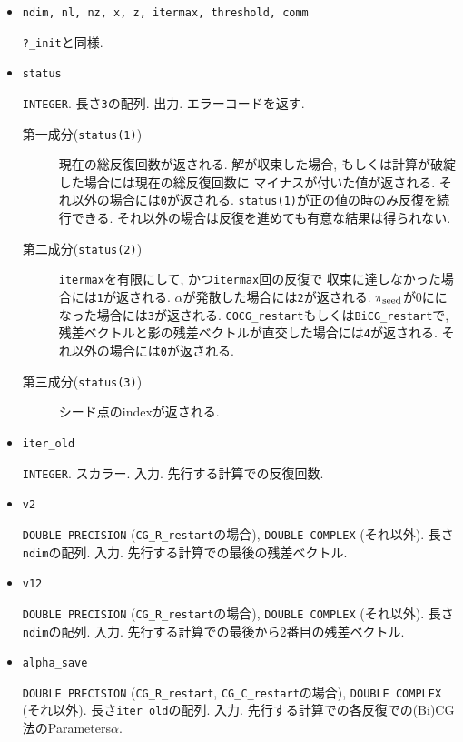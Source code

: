 \documentclass[12pt,titlepage]{article}
\begin{document}
\begin{itemize}

\item \verb|ndim, nl, nz, x, z, itermax, threshold, comm|

  \verb|?_init|と同様.

\item \verb|status|

  \verb|INTEGER|. 長さ\verb|3|の配列. 出力. エラーコードを返す.
  \begin{description}
  \item [第一成分(\texttt{status(1)})]
    現在の総反復回数が返される.
    解が収束した場合, もしくは計算が破綻した場合には現在の総反復回数に
    マイナスが付いた値が返される.
    それ以外の場合には\verb|0|が返される.
    \verb|status(1)|が正の値の時のみ反復を続行できる.
    それ以外の場合は反復を進めても有意な結果は得られない.
    
  \item [第二成分(\texttt{status(2)})]
    \verb|itermax|を有限にして, かつ\verb|itermax|回の反復で
    収束に達しなかった場合には\verb|1|が返される.
    $\alpha$が発散した場合には\verb|2|が返される.
    $\pi_{\rm seed}$が0にになった場合には\verb|3|が返される.
    \verb|COCG_restart|もしくは\verb|BiCG_restart|で,
    残差ベクトルと影の残差ベクトルが直交した場合には\verb|4|が返される.
    それ以外の場合には\verb|0|が返される.

  \item [第三成分(\texttt{status(3)})]
    シード点のindexが返される.
  \end{description}

\item \verb|iter_old|

  \verb|INTEGER|. スカラー. 入力. 先行する計算での反復回数.

\item \verb|v2|

  \verb|DOUBLE PRECISION| (\verb|CG_R_restart|の場合),
  \verb|DOUBLE COMPLEX| (それ以外).
  長さ\verb|ndim|の配列. 入力.
  先行する計算での最後の残差ベクトル.

\item \verb|v12|

  \verb|DOUBLE PRECISION| (\verb|CG_R_restart|の場合),
  \verb|DOUBLE COMPLEX| (それ以外).
  長さ\verb|ndim|の配列. 入力.
  先行する計算での最後から2番目の残差ベクトル.

\item \verb|alpha_save|

  \verb|DOUBLE PRECISION| (\verb|CG_R_restart|, \verb|CG_C_restart|の場合),
  \verb|DOUBLE COMPLEX| (それ以外).
  長さ\verb|iter_old|の配列. 入力. 先行する計算での各反復での(Bi)CG法のParameters$\alpha$.


\end{itemize}
\end{document}
